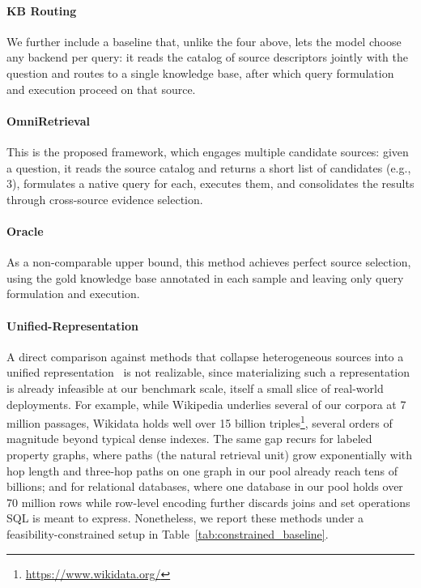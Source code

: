\vspace{-0.025in}
\paragraph{KB Routing}
We further include a baseline that, unlike the four above, lets the model choose any backend per query: it reads the catalog of source descriptors jointly with the question and routes to a single knowledge base, after which query formulation and execution proceed on that source.

\vspace{-0.025in}
\paragraph{OmniRetrieval}
This is the proposed framework, which engages multiple candidate sources: given a question, it reads the source catalog and returns a short list of candidates (e.g., 3), formulates a native query for each, executes them, and consolidates the results through cross-source evidence selection.

\vspace{-0.025in}
\paragraph{Oracle}
As a non-comparable upper bound, this method achieves perfect source selection, using the gold knowledge base annotated in each sample and leaving only query formulation and execution.

\vspace{-0.025in}
\paragraph{Unified-Representation}
A direct comparison against methods that collapse heterogeneous sources into a unified representation~\citep{UniK, UDT, DiFaR} is not realizable, since materializing such a representation is already infeasible at our benchmark scale, itself a small slice of real-world deployments. For example, while Wikipedia underlies several of our corpora at 7 million passages, Wikidata holds well over 15 billion triples\footnote{\url{https://www.wikidata.org/}}, several orders of magnitude beyond typical dense indexes. The same gap recurs for labeled property graphs, where paths (the natural retrieval unit) grow exponentially with hop length and three-hop paths on one graph in our pool already reach tens of billions; and for relational databases, where one database in our pool holds over 70 million rows while row-level encoding further discards joins and set operations SQL is meant to express. Nonetheless, we report these methods under a feasibility-constrained setup in Table~\ref{tab:constrained_baseline}.


